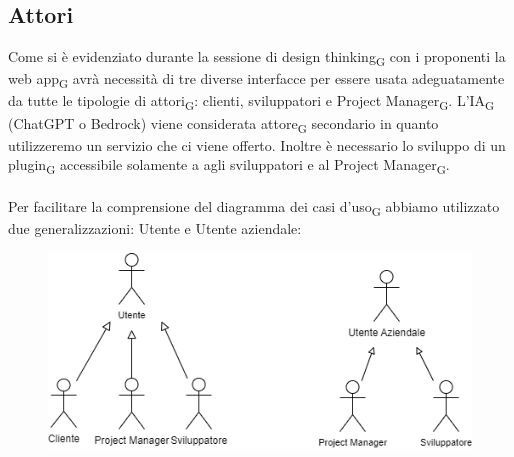 \documentclass{article}
\begin{document}
\subsection*{Attori}
Come si è evidenziato durante la sessione di design thinking\textsubscript{G} con i proponenti la web app\textsubscript{G} avrà necessità di tre diverse interfacce per essere usata adeguatamente da tutte le tipologie di attori\textsubscript{G}: clienti, sviluppatori e Project Manager\textsubscript{G}. L'IA\textsubscript{G}  (ChatGPT o Bedrock) viene considerata attore\textsubscript{G} secondario in quanto utilizzeremo un servizio che ci viene offerto. Inoltre è necessario lo sviluppo di un plugin\textsubscript{G} accessibile solamente a agli sviluppatori e al Project Manager\textsubscript{G}.\\\\

Per facilitare la comprensione del diagramma dei casi d'uso\textsubscript{G}  abbiamo utilizzato due generalizzazioni: Utente e Utente aziendale: 

\begin{figure}[h]
    \centering
    \includegraphics{./imgUML/Attori.png}
    \label{fig:immagine}
\end{figure}
\end{document}
